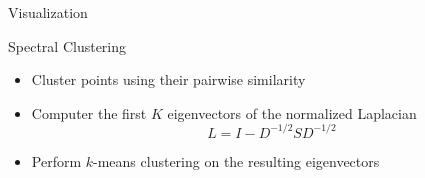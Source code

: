 \documentclass[handout,13pt]{beamer}
\begin{document}
\begin{frame}{Visualization}
\begin{figure}[h]
\centering
{}
\label{fig:mds}
\end{figure}
\end{frame}


\begin{frame}{Spectral Clustering}
\begin{itemize}
\item Cluster points using their pairwise similarity
\item Computer the first $K$ eigenvectors of the normalized Laplacian
  \begin{equation*}
  L = I - D^{-1/2} S D^{-1/2}
  \end{equation*}
\item Perform $k$-means clustering on the resulting eigenvectors
\end{itemize}
\end{frame}
\end{document}
